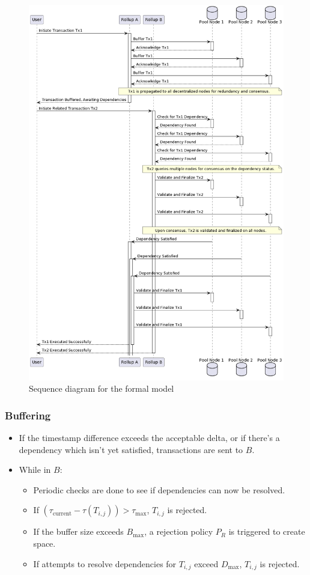 \documentclass{article}
\begin{document}
\begin{figure}[ht]
  \centering
  \includegraphics[scale=0.4]{diagram3}
  \caption{Sequence diagram for the formal model}
\end{figure}


\subsubsection{Buffering}
\begin{itemize}
    \item If the timestamp difference exceeds the acceptable delta, or if there’s a dependency which isn’t yet satisfied, transactions are sent to \( B \).
    \item While in \( B \):
    \begin{itemize}
        \item Periodic checks are done to see if dependencies can now be resolved.
        \item If \( (\tau_{\text{current}} - \tau(T_{i,j})) > \tau_{\text{max}} \), \( T_{i,j} \) is rejected.
        \item If the buffer size exceeds \( B_{\text{max}} \), a rejection policy \( P_R \) is triggered to create space.
        \item If attempts to resolve dependencies for \( T_{i,j} \) exceed \( D_{\text{max}} \), \( T_{i,j} \) is rejected.
    \end{itemize}
\end{itemize}
\end{document}
